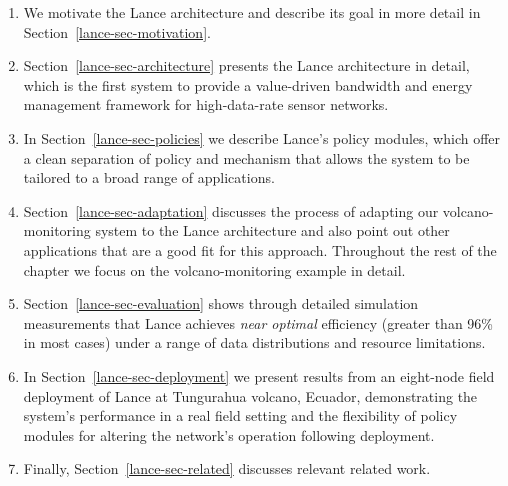 \begin{enumerate}

\item We motivate the Lance architecture and describe its goal in more detail
in Section~\ref{lance-sec-motivation}.

\item Section~\ref{lance-sec-architecture} presents the Lance architecture in
detail, which is the first system to provide a value-driven bandwidth and
energy management framework for high-data-rate sensor networks.

\item In Section~\ref{lance-sec-policies} we describe Lance's policy modules,
which offer a clean separation of policy and mechanism that allows the system
to be tailored to a broad range of applications.

\item Section~\ref{lance-sec-adaptation} discusses the process of
adapting our volcano-monitoring system to the Lance architecture and also
point out other applications that are a good fit for this approach.
Throughout the rest of the chapter we focus on the volcano-monitoring example
in detail.

\item Section~\ref{lance-sec-evaluation} shows through detailed simulation
measurements that Lance achieves \textit{near optimal} efficiency (greater
than 96\% in most cases) under a range of data distributions and resource
limitations.

\item In Section~\ref{lance-sec-deployment} we present results from an
eight-node field deployment of Lance at Tungurahua volcano, Ecuador,
demonstrating the system's performance in a real field setting and the
flexibility of policy modules for altering the network's operation following
deployment.

\item Finally, Section~\ref{lance-sec-related} discusses relevant related
work.

\end{enumerate}
